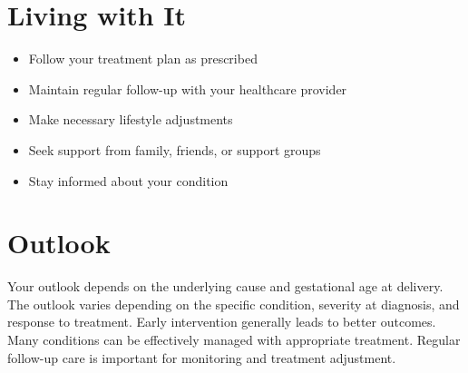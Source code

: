 \section{Living with It}
\begin{itemize}[noitemsep]
  \item Follow your treatment plan as prescribed
  \item Maintain regular follow-up with your healthcare provider
  \item Make necessary lifestyle adjustments
  \item Seek support from family, friends, or support groups
  \item Stay informed about your condition
\end{itemize}
\section{Outlook}
Your outlook depends on the underlying cause and gestational age at delivery. The outlook varies depending on the specific condition, severity at diagnosis, and response to treatment. Early intervention generally leads to better outcomes. Many conditions can be effectively managed with appropriate treatment. Regular follow-up care is important for monitoring and treatment adjustment.
